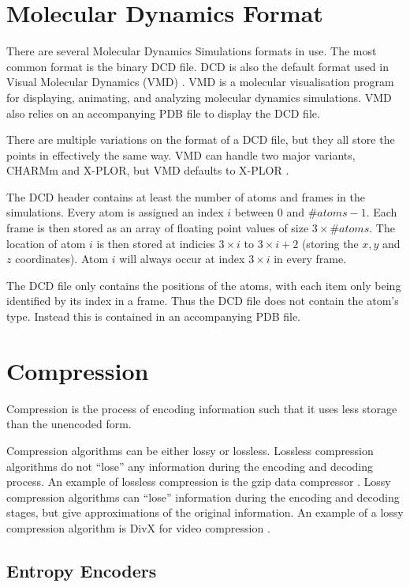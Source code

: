 \documentclass[a4paper]{report}
\begin{document}
\section{Molecular Dynamics Format}
\label{sec:molec-dynam-form}

There are several Molecular Dynamics Simulations formats in use. The most
common format is the binary DCD file. DCD is also the default format used in
Visual Molecular Dynamics (VMD) \citep{vmd}. VMD is a molecular visualisation
program for displaying, animating, and analyzing molecular dynamics
simulations. VMD also relies on an accompanying PDB file to display the DCD
file.

There are multiple variations on the format of a DCD file, but they all store
the points in effectively the same way. VMD can handle two major variants,
CHARMm and X-PLOR, but VMD defaults to X-PLOR \citep{vmddcdformat}.

The DCD header contains at least the number of atoms and frames in the
simulations. Every atom is assigned an index $i$ between $0$ and $\#atoms -
1$. Each frame is then stored as an array of floating point values of size $3
\times \#atoms$. The location of atom $i$ is then stored at indicies $3 \times
i$ to $3 \times i + 2$ (storing the $x, y$ and $z$ coordinates). Atom $i$ will
always occur at index $3 \times i$ in every frame.

The DCD file only contains the positions of the atoms, with each item only
being identified by its index in a frame. Thus the DCD file does not contain
the atom's type. Instead this is contained in an accompanying PDB file.


\section{Compression}

Compression is the process of encoding information such that it uses less
storage than the unencoded form.

Compression algorithms can be either lossy or lossless. Lossless compression
algorithms do not ``lose'' any information during the encoding and decoding
process. An example of lossless compression is the gzip data compressor
\citep{gzip}. Lossy compression algorithms can ``lose'' information during the
encoding and decoding stages, but give approximations of the original
information. An example of a lossy compression algorithm is DivX for video
compression \citep{divx}.

\subsection{Entropy Encoders}
\end{document}
